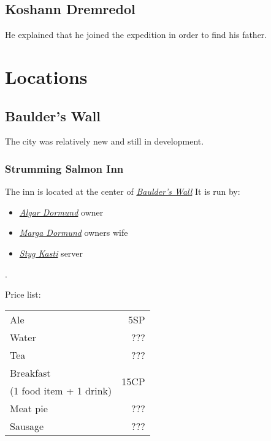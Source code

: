 \documentclass{article}
\begin{document}
\begin{multicols}{2}
    \subsection{Koshann Dremredol}
    \label{koshann}

    He explained that he joined the expedition in order to find his father.

    \section{Locations}
    \label{locations}

    \subsection{Baulder's Wall}
    \label{baulders_wall}

    The city was relatively new and still in development.

    \subsubsection{Strumming Salmon Inn}
    \label{strumming_salmon}

    The inn is located at the center of \hyperref[baulders_wall]{\textit{Baulder's Wall}} It is run by:

    \begin{itemize}
        \item \hyperref[algar]{\textit{Algar Dormund}} owner
        \item \hyperref[marga]{\textit{Marga Dormund}} owners wife
        \item \hyperref[styg]{\textit{Styg Kasti}} server
    \end{itemize}.

    Price list:

    \begin{tabular}{l r}
        Ale                   & \multirow{1}{1cm}{5SP}  \\
        Water                 & \multirow{1}{1cm}{???}  \\
        Tea                   & \multirow{1}{1cm}{???}  \\
        Breakfast             & \multirow{2}{1cm}{15CP} \\
        (1 food item + 1 drink)                         \\
        Meat pie              & \multirow{1}{1cm}{???}  \\
        Sausage \and potatoes & \multirow{1}{1cm}{???}  \\
    \end{tabular}


\end{multicols}
\end{document}
